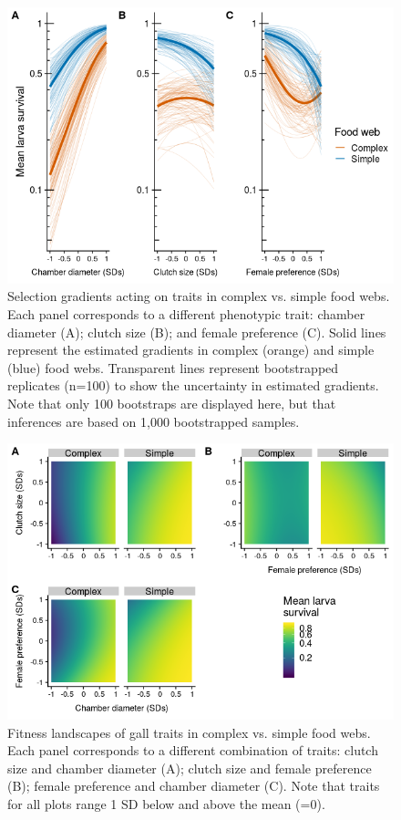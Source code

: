 \documentclass[11pt]{article}
\begin{document}
\begin{figure}[h!]
\includegraphics{Univariate-Fitness-Landscapes-1.png}
\caption{Selection gradients acting on  traits in complex vs. simple food webs. Each panel corresponds to a different phenotypic trait: chamber diameter (A); clutch size (B); and female preference (C). Solid lines represent the estimated gradients in complex (orange) and simple (blue) food webs. Transparent lines represent bootstrapped replicates (n=100) to show the uncertainty in estimated gradients. Note that only 100 bootstraps are displayed here, but that inferences are based on 1,000 bootstrapped samples.}
\label{Fig:FL_1D}
\end{figure}

\begin{figure}[h!]
\includegraphics{Multivariate-Fitness-Landscapes-1.png}
\caption{Fitness landscapes of gall traits in complex vs. simple food webs. Each panel corresponds to a different combination of traits: clutch size and chamber diameter (A); clutch size and female preference (B); female preference and chamber diameter (C). Note that traits for all plots range 1 SD below and above the mean (=0).}
\label{Fig:FL_2D}
\end{figure}
\end{document}
